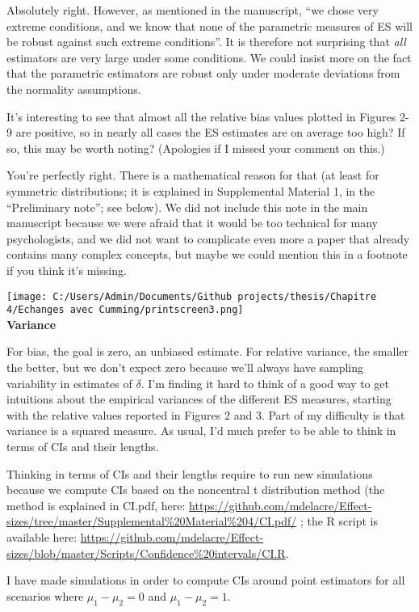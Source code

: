 \documentclass[
  12pt,
  french,
]{article}
\begin{document}
\color{blue} Absolutely right. However, as mentioned in the manuscript,
``we chose very extreme conditions, and we know that none of the
parametric measures of ES will be robust against such extreme
conditions''. It is therefore not surprising that \emph{all} estimators
are very large under some conditions. We could insist more on the fact
that the parametric estimators are robust only under moderate deviations
from the normality assumptions.

\color{black} It's interesting to see that almost all the relative bias
values plotted in Figures 2-9 are positive, so in nearly all cases the
ES estimates are on average too high? If so, this may be worth noting?
(Apologies if I missed your comment on this.)

\color{blue} You're perfectly right. There is a mathematical reason for
that (at least for symmetric distributions; it is explained in
Supplemental Material 1, in the ``Preliminary note''; see below). We did
not include this note in the main manuscript because we were afraid that
it would be too technical for many psychologists, and we did not want to
complicate even more a paper that already contains many complex
concepts, but maybe we could mention this in a footnote if you think
it's missing.

\texttt{[image: C:/Users/Admin/Documents/Github projects/thesis/Chapitre 4/Echanges avec Cumming/printscreen3.png]}\\
\color{black} \textbf{Variance}

For bias, the goal is zero, an unbiased estimate. For relative variance,
the smaller the better, but we don't expect zero because we'll always
have sampling variability in estimates of \(\delta\). I'm finding it
hard to think of a good way to get intuitions about the empirical
variances of the different ES measures, starting with the relative
values reported in Figures 2 and 3. Part of my difficulty is that
variance is a squared measure. As usual, I'd much prefer to be able to
think in terms of CIs and their lengths.

\color{blue} Thinking in terms of CIs and their lengths require to run
new simulations because we compute CIs based on the noncentral t
distribution method (the method is explained in CI.pdf, here:
\url{https://github.com/mdelacre/Effect-sizes/tree/master/Supplemental\%20Material\%204/CI.pdf/}
; the R script is available here:
\url{https://github.com/mdelacre/Effect-sizes/blob/master/Scripts/Confidence\%20intervals/CI.R}.

I have made simulations in order to compute CIs around point estimators
for all scenarios where \(\mu_1-\mu_2 = 0\) and \(\mu_1-\mu_2 = 1\).
\end{document}
